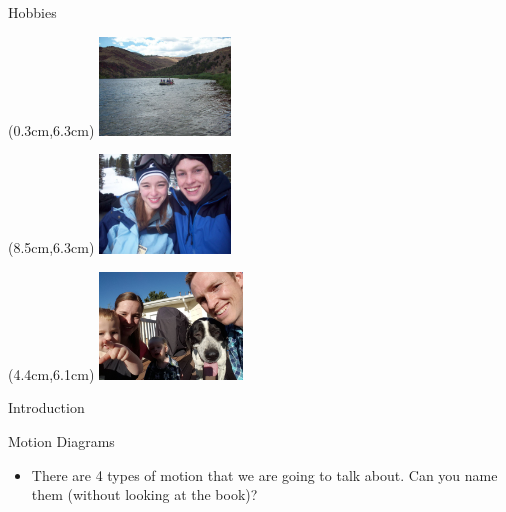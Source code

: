 \documentclass{beamer}
\begin{document}
\begin{frame}{Hobbies}
   \begin{textblock*}{\textwidth}(0.3cm,6.3cm) %
      \includegraphics[width=3.5cm]{../figures/rafting.jpg}
   \end{textblock*}
   \begin{textblock*}{\textwidth}(8.5cm,6.3cm) %
      \includegraphics[width=3.5cm]{../figures/skiing.jpg}
   \end{textblock*}
   \begin{textblock*}{\textwidth}(4.4cm,6.1cm) %
      \includegraphics[width=3.8cm]{../figures/ziggy.jpg}
   \end{textblock*}
\end{frame}

\begin{frame}{Introduction}
\begin{center}
\end{center}
\end{frame}
\fi

\begin{frame}{Motion Diagrams}
\begin{itemize}
   \item There are 4 types of motion that we are going to talk about. Can you name them (without looking at the book)?
\end{itemize}
\end{frame}
\end{document}
